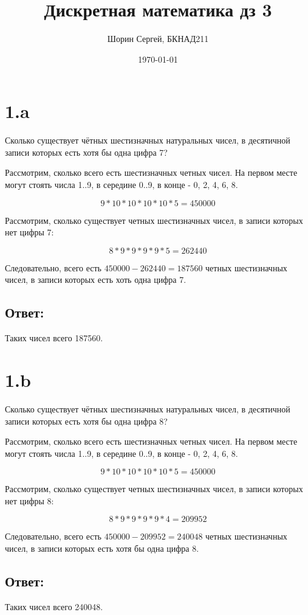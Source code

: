\documentclass[a4paper]{article}
\author{Шорин Сергей, БКНАД211}
\title{Дискретная математика дз 3}
\date{\today}
\begin{document}
\maketitle

\newpage

\section*{1.a}
Сколько существует чётных шестизначных натуральных чисел, в десятичной записи которых есть хотя бы одна цифра 7?


Рассмотрим, сколько всего есть шестизначных четных чисел. На первом месте могут стоять числа 1..9, в середине 0..9, в конце - 0, 2, 4, 6, 8.

$$9 * 10 * 10 * 10 * 10 * 5 = 450000$$

Рассмотрим, сколько существует четных шестизначных чисел, в записи которых нет цифры 7:

$$8 * 9 * 9 * 9 * 9 * 5 = 262440$$

Следовательно, всего есть $450000 - 262440 = 187560 $ четных шестизначных чисел, в записи которых есть хоть одна цифра 7.
\subsection*{Ответ:}
Таких чисел всего 187560.






\section*{1.b}
Сколько существует чётных шестизначных натуральных чисел, в десятичной записи которых есть хотя бы одна цифра 8?


Рассмотрим, сколько всего есть шестизначных четных чисел. На первом месте могут стоять числа 1..9, в середине 0..9, в конце - 0, 2, 4, 6, 8.

$$9 * 10 * 10 * 10 * 10 * 5 = 450000$$

Рассмотрим, сколько существует четных шестизначных чисел, в записи которых нет цифры 8:

$$8 * 9 * 9 * 9 * 9 * 4 = 209952$$

Следовательно, всего есть $450000 - 209952 = 240048 $ четных шестизначных чисел, в записи которых есть хотя бы одна цифра 8.
\subsection*{Ответ:}
Таких чисел всего 240048.
\end{document}
